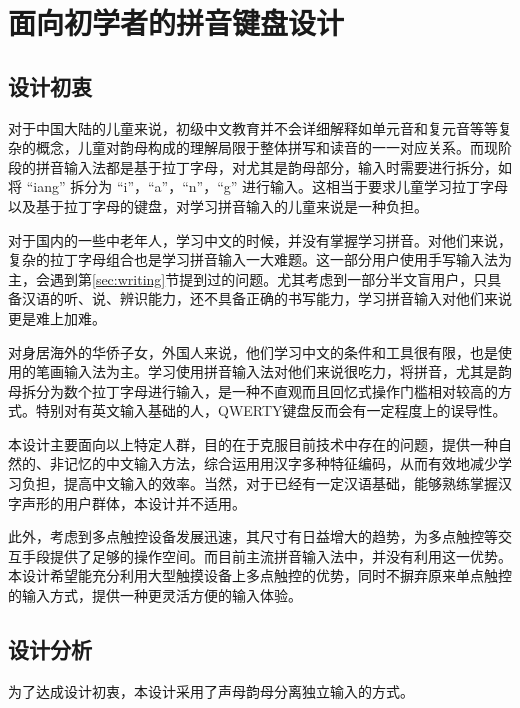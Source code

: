 \chapter{面向初学者的拼音键盘设计}
	\section{设计初衷}

  对于中国大陆的儿童来说，初级中文教育并不会详细解释如单元音和复元音等等复杂的概念，儿童对韵母构成的理解局限于整体拼写和读音的一一对应关系。而现阶段的拼音输入法都是基于拉丁字母，对尤其是韵母部分，输入时需要进行拆分，如将 “iang” 拆分为 “i”，“a”，“n”，“g” 进行输入。这相当于要求儿童学习拉丁字母以及基于拉丁字母的键盘，对学习拼音输入的儿童来说是一种负担。

	对于国内的一些中老年人，学习中文的时候，并没有掌握学习拼音。对他们来说，复杂的拉丁字母组合也是学习拼音输入一大难题。这一部分用户使用手写输入法为主，会遇到第\ref{sec:writing}节提到过的问题。尤其考虑到一部分半文盲用户，只具备汉语的听、说、辨识能力，还不具备正确的书写能力，学习拼音输入对他们来说更是难上加难。

	对身居海外的华侨子女，外国人来说，他们学习中文的条件和工具很有限，也是使用的笔画输入法为主。学习使用拼音输入法对他们来说很吃力，将拼音，尤其是韵母拆分为数个拉丁字母进行输入，是一种不直观而且回忆式操作门槛相对较高的方式。特别对有英文输入基础的人，QWERTY键盘反而会有一定程度上的误导性。

	本设计主要面向以上特定人群，⽬的在于克服目前技术中存在的问题，提供⼀种自然的、⾮记忆的中⽂输⼊方法，综合运⽤用汉字多种特征编码，从⽽有效地减少学习负担，提高中⽂输入的效率。当然，对于已经有一定汉语基础，能够熟练掌握汉字声形的用户群体，本设计并不适用。

  此外，考虑到多点触控设备发展迅速，其尺寸有日益增大的趋势，为多点触控等交互手段提供了足够的操作空间。而目前主流拼音输入法中，并没有利用这一优势。本设计希望能充分利用大型触摸设备上多点触控的优势，同时不摒弃原来单点触控的输入方式，提供一种更灵活方便的输入体验。

	\section{设计分析}

	为了达成设计初衷，本设计采用了声母韵母分离独立输入的方式。

